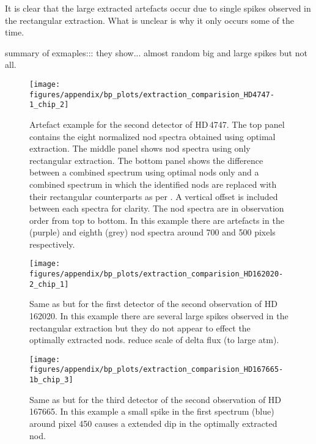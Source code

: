 It is clear that the large extracted artefacts occur due to single spikes observed in the rectangular extraction. What is unclear is why it only occurs some of the time.

summary of exmaples::: they show...  almost random big and large spikes but not all.



 \begin{figure}
     \centering
     \texttt{[image: figures/appendix/bp\_plots/extraction\_comparision\_HD4747-1\_chip\_2]}
     \caption{Artefact example for the second detector of {HD\,4747}.  The top panel contains the eight normalized nod spectra obtained using optimal extraction. The middle panel shows nod spectra using only rectangular extraction. The bottom panel shows the difference between a combined spectrum using optimal nods only and a combined spectrum in which the identified nods are replaced with their rectangular counterparts as per . A vertical offset is included between each spectra for clarity. The nod spectra are in observation order from top to bottom. In this example there are artefacts in the  (purple) and eighth (grey) nod spectra around 700 and 500 pixels respectively.}
     \label{fig:artefact_example1}
 \end{figure}
 \begin{figure}
     \centering
     \texttt{[image: figures/appendix/bp\_plots/extraction\_comparision\_HD162020-2\_chip\_1]}
     \caption{Same as  but for the first detector of the second observation of {HD\,162020}. In this example there are several large spikes observed in the rectangular extraction but they do not appear to effect the optimally extracted nods. {\red{} reduce scale of delta flux (to large atm)}.}
     \label{fig:artefact_example2}
 \end{figure}
 \begin{figure}
     \centering
     \texttt{[image: figures/appendix/bp\_plots/extraction\_comparision\_HD167665-1b\_chip\_3]}
     \caption{Same as  but for the third detector of the second observation of {HD\,167665}. In this example a small spike in the first spectrum (blue) around pixel 450 causes a extended dip in the optimally extracted nod.}
     \label{fig:artefact_example3}
 \end{figure}
